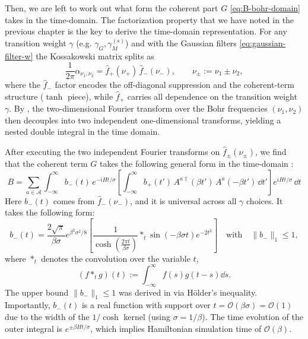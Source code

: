 Then, we are left to work out what form the coherent part $G$ \eqref{eq:B-bohr-domain} takes in the time-domain. The factorization property that we have noted in the previous chapter is the key to derive the time-domain representation. For any transition weight $\gamma$ (e.g. $\gamma_G, \gamma_M^{(s)}$) and with the Gaussian filters \eqref{eq:gaussian-filter-w} the Kossakowski matrix splits as
\begin{equation}
    \frac{1}{2\pi}\alpha_{\nu_1,\nu_2} = \hat{f}_+(\nu_+)\,\hat{f}_-(\nu_-), \qquad \nu_{\pm} := \nu_1 \pm \nu_2,
\end{equation}
where the $\hat{f}_-$ factor encodes the off-diagonal suppression and the coherent-term structure ($\tanh$ piece), while $\hat{f}_+$ carries all dependence on the transition weight $\gamma$. By \cite[Corollary~A.1]{chen2023efficient}, the two-dimensional Fourier transform over the Bohr frequencies $(\nu_1,\nu_2)$ then decouples into two independent one-dimensional transforms, yielding a nested double integral in the time domain. 

After executing the two independent Fourier transforms on $\hat{f}_\pm(\nu_\pm)$, we find that the coherent term $G$ takes the following general form in the time-domain \cite[Corollary III.1]{chen2023efficient}:
\begin{equation} \label{eq:coherent-time-domain}
    B = \sum_{a \in \mathcal{A}} \int_{-\infty}^{\infty} b_-(t)\, e^{-iHt / \sigma} \left[\int_{-\infty}^{\infty} b_+(t')\, A^{a\dagger}(\beta t')\, A^a(-\beta t')\,\dd t' \right] e^{iHt/\sigma}\,\dd t
\end{equation}
Here $b_-(t)$ comes from $\hat{f}_-(\nu_-)$, and it is universal across all $\gamma$ choices. It takes the following form:
\begin{equation} \label{eq:b_minus}
    b_-(t) = \frac{2\sqrt{\pi}}{\beta \sigma}e^{\beta^2\sigma^2/8}\left[\frac{1}{\cosh(\frac{2\pi t}{\beta \sigma})}\ast_t \sin(-\beta \sigma t) e^{-2t^2}\right] \quad\text{with}\quad \|b_-\|_1 \leq 1,
\end{equation}
where $\ast_t$ denotes the convolution over the variable $t$, 
$$
    (f \ast_t g)(t) := \int_{-\infty}^{\infty} f(s) g(t - s)\dd s.
$$
The upper bound $\|b_-\|_1 \leq 1$ was derived in \cite[Cor. III.1]{chen2023efficient} via Hölder's inequality. Importantly, $b_-(t)$ is a real function with support over $t = \mathcal{O}(\beta \sigma) = \mathcal{O}(1)$ due to the width of the $1 / \cosh$ kernel (using $\sigma = 1 / \beta$). The time evolution of the outer integral is $e^{\pm \beta H t / \sigma}$, which implies Hamiltonian simulation time of $\mathcal{O}(\beta)$.

